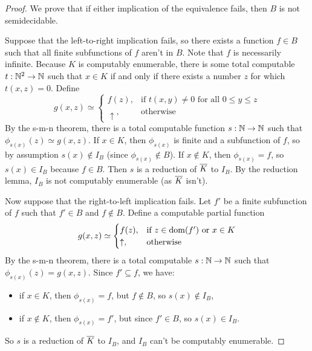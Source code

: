 \begin{proof}
  We prove that if either implication of the equivalence fails, then $B$ is not
  semidecidable.

  Suppose that the left-to-right implication fails, so there exists a function
  $f \in B$ such that all finite subfunctions of $f$ aren't in $B$.
  Note that $f$ is necessarily infinite.
  Because $K$ is computably enumerable, there is some total computable $t: \mathbb{N}^2
  \to \mathbb{N}$ such that $x \in K$ if and only if there exists a number $z$ for which
  $t(x,z) = 0$.
  Define
  \[
	g(x,z) \simeq
	\begin{cases}
	  f(z), & \text{if $t(x,y) \ne 0$ for all $0 \le y \le z$} \\
	  \uparrow, & \text{otherwise}
	\end{cases}
  \]
  By the s-m-n theorem, there is a total computable function $s: \mathbb{N} \to \mathbb{N}$ such
  that $\phi_{s(x)}(z) \simeq g(x,z)$.
  If $x \in K$, then $\phi_{s(x)}$ is finite and a subfunction of $f$, so by
  assumption $s(x) \notin I_B$ (since $\phi_{s(x)} \notin B$).
  If $x \notin K$, then $\phi_{s(x)} = f$, so $s(x) \in I_B$ because $f \in B$.
  Then $s$ is a reduction of $\overline{K}$ to $I_B$.
  By the reduction lemma, $I_B$ is not computably enumerable (as $\overline{K}$
  isn't).

  Now suppose that the right-to-left implication fails.
  Let $f'$ be a finite subfunction of $f$ such that $f' \in B$ and $f \notin B$.
  Define a computable partial function
  \[
	g(x,z) \simeq
	\begin{cases}
	  f(z), & \text{if $z \in \operatorname{dom}(f')$ or $x \in K$} \\
	  \uparrow, & \text{otherwise}
	\end{cases}
  \]
  By the s-m-n theorem, there is a total computable $s: \mathbb{N} \to \mathbb{N}$ such that
  $\phi_{s(x)}(z) = g(x,z)$.
  Since $f' \subseteq f$, we have:
  \begin{itemize}
  \item if $x \in K$, then $\phi_{s(x)} = f$, but $f \notin B$, so $s(x) \notin
	I_B$,
  \item if $x \notin K$, then $\phi_{s(x)} = f'$, but since $f' \in B$, so $s(x)
	\in I_B$.
  \end{itemize}
  So $s$ is a reduction of $\overline{K}$ to $I_B$, and $I_B$ can't be computably
  enumerable.
\end{proof}



